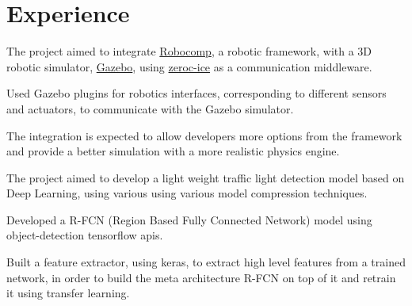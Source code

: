 \documentclass[]{deedy-resume-openfont}
\begin{document}
\begin{minipage}[t]{0.66\textwidth} 


\section{Experience}

\vspace{\topsep} %
\begin{tightemize}
\item The project aimed to integrate \href{https://robocomp.github.io/web/}{Robocomp}, a robotic framework, with a 3D robotic simulator, \href{http://gazebosim.org}{Gazebo}, using \href{https://doc.zeroc.com/ice/3.6/}{zeroc-ice} as a communication middleware.
\item Used Gazebo plugins for robotics interfaces, corresponding to different sensors and actuators, to communicate with the Gazebo simulator.
\item The integration is expected to allow developers more options from the framework and provide a better simulation with a more realistic physics engine.
\end{tightemize}
\sectionsep

\begin{tightemize}
\item The project aimed to develop a light weight traffic light detection model based on Deep Learning, using various using various model compression techniques.
\item Developed a R-FCN (Region Based Fully Connected Network) model using object-detection tensorflow apis. 
\item Built a feature extractor, using keras, to extract high level features from a trained network, in order to build the meta architecture R-FCN on top of it and retrain it using transfer learning.
\end{tightemize}
\sectionsep


\end{minipage}
\end{document}
